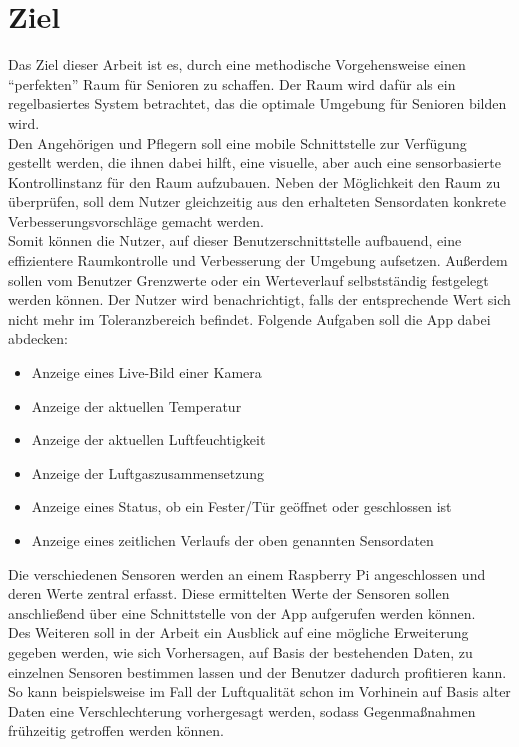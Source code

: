 \section{Ziel}
Das Ziel dieser Arbeit ist es, durch eine methodische Vorgehensweise einen ``perfekten'' Raum für Senioren zu schaffen. Der Raum wird dafür als ein regelbasiertes System betrachtet, das die optimale Umgebung für Senioren bilden wird.\\Den Angehörigen und Pflegern soll eine mobile Schnittstelle zur Verfügung gestellt werden, die ihnen dabei hilft, eine visuelle, aber auch eine sensorbasierte Kontrollinstanz für den Raum aufzubauen. Neben der Möglichkeit den Raum zu überprüfen, soll dem Nutzer gleichzeitig aus den erhalteten Sensordaten konkrete Verbesserungsvorschläge gemacht werden.\\
Somit können die Nutzer, auf dieser Benutzerschnittstelle aufbauend, eine effizientere Raumkontrolle und Verbesserung der Umgebung aufsetzen.
Außerdem sollen vom Benutzer Grenzwerte oder ein Werteverlauf selbstständig festgelegt werden können. Der Nutzer wird benachrichtigt, falls der entsprechende Wert sich nicht mehr im Toleranzbereich befindet. 
Folgende Aufgaben soll die App dabei abdecken:
\begin{itemize}
	\item Anzeige eines Live-Bild einer Kamera
	\item Anzeige der aktuellen Temperatur
	\item Anzeige der aktuellen Luftfeuchtigkeit
	\item Anzeige der Luftgaszusammensetzung
	\item Anzeige eines Status, ob ein Fester/Tür geöffnet oder geschlossen ist
	\item Anzeige eines zeitlichen Verlaufs der oben genannten Sensordaten
\end{itemize} 
Die verschiedenen Sensoren werden an einem Raspberry Pi angeschlossen und deren Werte zentral erfasst. Diese ermittelten Werte der Sensoren sollen anschließend über eine Schnittstelle von der App aufgerufen werden können. 
\\
Des Weiteren soll in der Arbeit ein Ausblick auf eine mögliche Erweiterung gegeben werden, wie sich Vorhersagen, auf Basis der bestehenden Daten, zu einzelnen Sensoren bestimmen lassen und der Benutzer dadurch profitieren kann. So kann beispielsweise im Fall der Luftqualität schon im Vorhinein auf Basis alter Daten eine Verschlechterung vorhergesagt werden, sodass Gegenmaßnahmen frühzeitig getroffen werden können.

